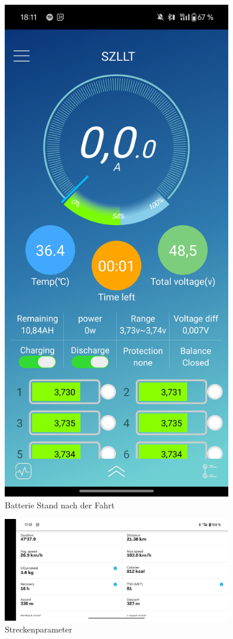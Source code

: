 \begin{figure}[h]
    \centering
    \includegraphics[width=10cm]{images/BMSnachderFahrt}
    \caption{Batterie Stand nach der Fahrt\cite{lorenz_scherrer_selbst_2023}}
    \label{fig:32}
\end{figure}

\begin{figure}[h]
    \centering
    \includegraphics[width=10cm]{images/streckenparameter}
    \caption{Streckenparameter\cite{lorenz_scherrer_selbst_2023}}
    \label{fig:33}
\end{figure}

